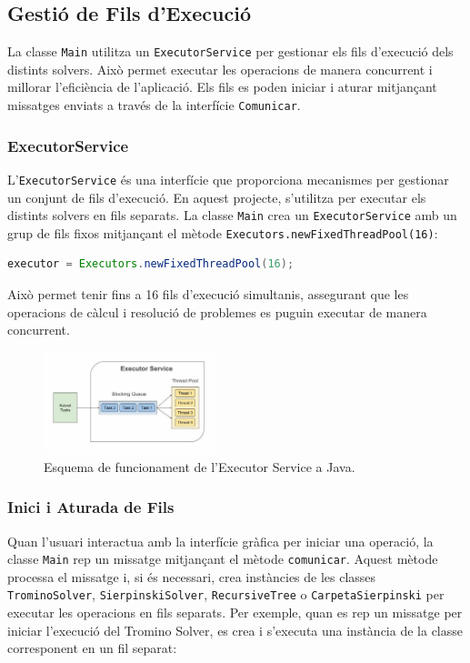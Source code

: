 \documentclass{ieeetj}
\begin{document}
\subsection{Gestió de Fils d'Execució}
La classe \texttt{Main} utilitza un \texttt{ExecutorService} per gestionar els fils d'execució dels distints solvers. Això permet executar les operacions de manera concurrent i millorar l'eficiència de l'aplicació. Els fils es poden iniciar i aturar mitjançant missatges enviats a través de la interfície \texttt{Comunicar}.
\subsubsection{ExecutorService}
L'\texttt{ExecutorService} és una interfície que proporciona mecanismes per gestionar un conjunt de fils d'execució. En aquest projecte, s'utilitza per executar els distints solvers en fils separats\cite{oracleExecutorService}. La classe \texttt{Main} crea un \texttt{ExecutorService} amb un grup de fils fixos mitjançant el mètode \texttt{Executors.newFixedThreadPool(16)}:
\begin{lstlisting}[language=Java, basicstyle=\ttfamily\small]
executor = Executors.newFixedThreadPool(16);
\end{lstlisting}
Això permet tenir fins a 16 fils d'execució simultanis, assegurant que les operacions de càlcul i resolució de problemes es puguin executar de manera concurrent.

\begin{figure}[htbp]
\centerline{\includegraphics[width=0.45\textwidth]{png/executorService.png}}
\caption{Esquema de funcionament de l'Executor Service a Java.}
\label{fig:exeServ}
\end{figure}

\subsubsection{Inici i Aturada de Fils}
Quan l'usuari interactua amb la interfície gràfica per iniciar una operació, la classe \texttt{Main} rep un missatge mitjançant el mètode \texttt{comunicar}. Aquest mètode processa el missatge i, si és necessari, crea instàncies de les classes \texttt{TrominoSolver}, \texttt{SierpinskiSolver}, \texttt{RecursiveTree} o \texttt{CarpetaSierpinski} per executar les operacions en fils separats. Per exemple, quan es rep un missatge per iniciar l'execució del Tromino Solver, es crea i s'executa una instància de la classe corresponent en un fil separat:
\end{document}
